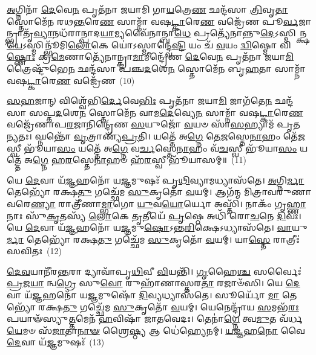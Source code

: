 {\anuvakamend[{\-\ul{𑌜𑌿}\-𑌨𑍍𑌵𑍇𑌤𑍍𑌯𑌵᳴ \ul{𑌪𑍍𑌰}\-𑌜𑌾 𑌜𑌿᳴𑌨𑍍𑌵 \ul{𑌪𑍍𑌰𑌾}\-𑌣\-\ul{𑌨𑍍𑌤𑍍𑌰𑌿}\-\-\ul{𑍞}\-𑌶𑌚𑍍𑌚᳴}]}%

\-\ul{𑌅}\-𑌗𑍍𑌨𑌿𑌨𑌾᳴ \ul{𑌦𑍇}\-𑌵𑍇\-\ul{𑌨} 𑌪𑍃𑌤᳴𑌨𑌾 𑌜𑌯𑌾𑌮𑌿 𑌗𑌾\-\ul{𑌯}\-𑌤𑍍𑌰𑍇\-\ul{𑌣} 𑌛𑌨𑍍𑌦᳴𑌸𑌾 \ul{𑌤𑍍𑌰𑌿}\-𑌵𑍃\-\ul{𑌤𑌾} 𑌸𑍍𑌤𑍋𑌮𑍇᳴𑌨 𑌰𑌥\-\ul{𑌨𑍍𑌤}\-𑌰𑍇\-\ul{𑌣} 𑌸𑌾𑌮𑍍𑌨𑌾᳴ 𑌵𑌷\-\ul{𑌟𑍍𑌕𑌾}\-𑌰𑍇\-\ul{𑌣} 𑌵𑌜𑍍𑌰𑍇᳴𑌣 𑌪𑍂\-\ul{𑌰𑍍𑌵}\-𑌜𑌾𑌨𑍍𑌭𑍍𑌰𑌾𑌤𑍃᳴\-\ul{𑌵𑍍𑌯𑌾}\-𑌨𑌧᳴𑌰𑌾𑌨𑍍𑌪𑌾𑌦\-\ul{𑌯𑌾}\-𑌮𑍍𑌯𑌵𑍈᳴𑌨𑌾𑌨𑍍𑌬𑌾\-\ul{𑌧𑍇} 𑌪𑍍𑌰𑌤𑍍𑌯𑍇᳴𑌨𑌾𑌨𑍍𑌨𑍁\-\ul{𑌦𑍇}\-\-𑌽𑌸𑍍𑌮𑌿𑌨𑍍𑌕𑍍𑌷\-\ul{𑌯𑍇}\-\-𑌽𑌸𑍍𑌮𑌿𑌨𑍍𑌭𑍂᳴𑌮𑌿\-\ul{𑌲𑍋}\-𑌕𑍇 𑌯𑍋॑\-𑌽𑌸𑍍𑌮𑌾𑌨𑍍𑌦𑍍𑌵𑍇\-\ul{𑌷𑍍𑌟𑌿} 𑌯𑌂 𑌚᳴ \ul{𑌵}\-𑌯𑌂 \ul{𑌦𑍍𑌵𑌿}\-𑌷𑍍𑌮𑍋 𑌵𑌿\-\ul{𑌷𑍍𑌣𑍋𑌃} 𑌕𑍍𑌰\-\ul{𑌮𑍇}\-𑌣𑌾𑌤𑍍𑌯𑍇᳴𑌨𑌾𑌨𑍍𑌕𑍍𑌰𑌾\-\ul{𑌮𑌾}\-𑌮𑍀𑌨𑍍𑌦𑍍𑌰𑍇᳴𑌣 \ul{𑌦𑍇}\-𑌵𑍇\-\ul{𑌨} 𑌪𑍃𑌤᳴𑌨𑌾 𑌜𑌯𑌾\-\ul{𑌮𑌿} 𑌤𑍍𑌰𑍈𑌷𑍍𑌟𑍁᳴𑌭𑍇\-\ul{𑌨} 𑌛𑌨𑍍𑌦᳴𑌸𑌾 𑌪𑌞𑍍𑌚\-\ul{𑌦}\-𑌶𑍇\-\ul{𑌨} 𑌸𑍍𑌤𑍋𑌮𑍇᳴𑌨 𑌬𑍃\-\ul{𑌹}\-𑌤𑌾 𑌸𑌾𑌮𑍍𑌨𑌾᳴ 𑌵𑌷\-\ul{𑌟𑍍𑌕𑌾}\-𑌰𑍇\-\ul{𑌣} 𑌵𑌜𑍍𑌰𑍇᳴𑌣~(10)

\-\ul{𑌸}\-\-\ul{𑌹}\-𑌜𑌾𑌨𑍍 𑌵𑌿𑌶𑍍𑌵𑍇᳴𑌭𑌿\-\ul{𑌰𑍍𑌦𑍇}\-𑌵𑍇\-\ul{𑌭𑌿𑌃} 𑌪𑍃𑌤᳴𑌨𑌾 𑌜𑌯𑌾\-\ul{𑌮𑌿} 𑌜𑌾𑌗᳴𑌤𑍇\-\ul{𑌨} 𑌛𑌨𑍍𑌦᳴𑌸𑌾 𑌸𑌪𑍍𑌤\-\ul{𑌦}\-𑌶𑍇\-\ul{𑌨} 𑌸𑍍𑌤𑍋𑌮𑍇᳴𑌨 𑌵𑌾𑌮\-\ul{𑌦𑍇}\-𑌵𑍍𑌯𑍇\-\ul{𑌨} 𑌸𑌾𑌮𑍍𑌨𑌾᳴ 𑌵𑌷\-\ul{𑌟𑍍𑌕𑌾}\-𑌰𑍇\-\ul{𑌣} 𑌵𑌜𑍍𑌰𑍇᳴𑌣𑌾𑌪\-\ul{𑌰}\-𑌜𑌾𑌨𑌿𑌨𑍍𑌦𑍍𑌰𑍇᳴𑌣 \ul{𑌸}\-𑌯𑍁𑌜𑍋᳴ \ul{𑌵}\-𑌯𑍞 𑌸𑌾᳴\-\ul{𑌸}\-𑌹𑍍𑌯𑌾𑌮᳴ 𑌪𑍃𑌤\-\ul{𑌨𑍍𑌯}\-𑌤𑌃। 𑌘𑍍𑌨𑌨𑍍𑌤𑍋᳴ \ul{𑌵𑍃}\-𑌤𑍍𑌰𑌾𑌣𑍍𑌯᳴\-\ul{𑌪𑍍𑌰}\-𑌤𑌿। 𑌯𑌤𑍍𑌤𑍇᳴ 𑌅\-\ul{𑌗𑍍𑌨𑍇} 𑌤𑍇\-\ul{𑌜}\-𑌸𑍍𑌤𑍇\-\ul{𑌨𑌾}\-𑌹𑌂 𑌤𑍇᳴\-\ul{𑌜}\-𑌸𑍍𑌵𑍀 𑌭𑍂᳴𑌯𑌾\-\ul{𑌸𑌂} 𑌯𑌤𑍍𑌤𑍇᳴ 𑌅\-\ul{𑌗𑍍𑌨𑍇} 𑌵\-\ul{𑌰𑍍𑌚}\-𑌸𑍍𑌤𑍇\-\ul{𑌨𑌾}\-𑌹𑌂 𑌵᳴\-\ul{𑌚}\-𑌸𑍍𑌵𑍀 𑌭𑍂᳴𑌯𑌾\-\ul{𑌸𑌂} 𑌯𑌤𑍍𑌤𑍇᳴ 𑌅\-\ul{𑌗𑍍𑌨𑍇} 𑌹\-\ul{𑌰}\-𑌸𑍍𑌤𑍇\-\ul{𑌨𑌾}\-𑌹𑍞 𑌹᳴\-\ul{𑌰}\-𑌸𑍍𑌵𑍀 𑌭𑍂᳴𑌯𑌾𑌸𑌮𑍍॥~(11)

{\anuvakamend[{\-\ul{𑌬𑍃}\-\-\ul{𑌹}\-𑌤𑌾 𑌸𑌾𑌮𑍍𑌨𑌾᳴ 𑌵𑌷\-\ul{𑌟𑍍𑌕𑌾}\-𑌰𑍇\-\ul{𑌣} 𑌵𑌜𑍍𑌰𑍇᳴\-\ul{𑌣} 𑌷𑌟𑍍𑌚᳴𑌤𑍍𑌵𑌾𑌰𑌿𑍞𑌶𑌚𑍍𑌚}]}%

𑌯𑍇 \ul{𑌦𑍇}\-𑌵𑌾 𑌯᳴\-\ul{𑌜𑍍𑌞}\-𑌹𑌨𑍋᳴ 𑌯\-\ul{𑌜𑍍𑌞}\-𑌮𑍁𑌷𑌃᳴ 𑌪𑍃\-\ul{𑌥𑌿}\-𑌵𑍍𑌯𑌾𑌮𑌧𑍍𑌯𑌾𑌸᳴𑌤𑍇। \ul{𑌅}\-𑌗𑍍𑌨𑌿\-\ul{𑌰𑍍𑌮𑌾} 𑌤𑍇𑌭𑍍𑌯𑍋᳴ 𑌰𑌕𑍍𑌷\-\ul{𑌤𑍁} 𑌗𑌚𑍍𑌛𑍇᳴𑌮 \ul{𑌸𑍁}\-𑌕𑍃𑌤𑍋᳴ \ul{𑌵}\-𑌯𑌮𑍍। 𑌆𑌗᳴𑌨𑍍𑌮 𑌮𑌿𑌤𑍍𑌰𑌾𑌵𑌰𑍁𑌣𑌾 𑌵𑌰𑍇\-\ul{𑌣𑍍𑌯𑌾} 𑌰𑌾𑌤𑍍𑌰𑍀᳴𑌣𑌾\-\ul{𑌮𑍍𑌭𑌾}\-𑌗𑍋 \ul{𑌯𑍁}\-𑌵\-\ul{𑌯𑍋}\-𑌰𑍍𑌯𑍋 𑌅𑌸𑍍𑌤𑌿᳴। 𑌨𑌾𑌕𑌂᳴ 𑌗𑍃\-\ul{𑌹𑍍𑌣𑌾}\-𑌨𑌾𑌃 𑌸𑍁᳴\-\ul{𑌕𑍃}\-𑌤𑌸𑍍𑌯᳴ \ul{𑌲𑍋}\-𑌕𑍇 \ul{𑌤𑍃}\-𑌤𑍀𑌯𑍇᳴ \ul{𑌪𑍃}\-𑌷𑍍𑌠𑍇 𑌅𑌧𑌿᳴ 𑌰𑍋\-\ul{𑌚}\-𑌨𑍇 \ul{𑌦𑌿}\-𑌵𑌃। 𑌯𑍇 \ul{𑌦𑍇}\-𑌵𑌾 𑌯᳴\-\ul{𑌜𑍍𑌞}\-𑌹𑌨𑍋᳴ 𑌯\-\ul{𑌜𑍍𑌞}\-𑌮𑍁\-\ul{𑌷𑍋}\-\-𑌽𑌨𑍍𑌤\-\ul{𑌰𑌿}\-𑌕𑍍𑌷𑍇\-𑌽𑌧𑍍𑌯𑌾𑌸᳴𑌤𑍇। \ul{𑌵𑌾}\-𑌯𑍁\-\ul{𑌰𑍍𑌮𑌾} 𑌤𑍇𑌭𑍍𑌯𑍋᳴ 𑌰𑌕𑍍𑌷\-\ul{𑌤𑍁} 𑌗𑌚𑍍𑌛𑍇᳴𑌮 \ul{𑌸𑍁}\-𑌕𑍃𑌤𑍋᳴ \ul{𑌵}\-𑌯𑌮𑍍। 𑌯𑌾\-\ul{𑌸𑍍𑌤𑍇} 𑌰𑌾𑌤𑍍𑌰𑍀𑌃॑ 𑌸𑌵𑌿𑌤𑌃~(12)

\-\ul{𑌦𑍇}\-\-\ul{𑌵}\-𑌯𑌾𑌨𑍀᳴𑌰\-\ul{𑌨𑍍𑌤}\-𑌰𑌾 𑌦𑍍𑌯𑌾𑌵𑌾᳴𑌪𑍃\-\ul{𑌥𑌿}\-𑌵𑍀 \ul{𑌵𑌿}\-𑌯𑌨𑍍𑌤𑌿᳴। \ul{𑌗𑍃}\-𑌹𑍈\-\ul{𑌶𑍍𑌚} 𑌸𑌰𑍍𑌵𑍈𑌃॑ \ul{𑌪𑍍𑌰}\-𑌜\-\ul{𑌯𑌾} 𑌨𑍍𑌵\-\ul{𑌗𑍍𑌰𑍇} 𑌸𑍁\-\ul{𑌵𑍋} 𑌰𑍁𑌹𑌾᳴𑌣𑌾𑌸𑍍𑌤𑌰\-\ul{𑌤𑌾} 𑌰𑌜𑌾𑍞᳴𑌸𑌿। 𑌯𑍇 \ul{𑌦𑍇}\-𑌵𑌾 𑌯᳴\-\ul{𑌜𑍍𑌞}\-𑌹𑌨𑍋᳴ 𑌯\-\ul{𑌜𑍍𑌞}\-𑌮𑍁𑌷𑍋᳴ \ul{𑌦𑌿}\-𑌵𑍍𑌯𑌧𑍍𑌯𑌾𑌸᳴𑌤𑍇। 𑌸𑍂𑌰𑍍𑌯𑍋᳴ \ul{𑌮𑌾} 𑌤𑍇𑌭𑍍𑌯𑍋᳴ 𑌰𑌕𑍍𑌷\-\ul{𑌤𑍁} 𑌗𑌚𑍍𑌛𑍇᳴𑌮 \ul{𑌸𑍁}\-𑌕𑍃𑌤𑍋᳴ \ul{𑌵}\-𑌯𑌮𑍍। 𑌯𑍇𑌨𑍇𑌨𑍍𑌦𑍍𑌰𑌾᳴𑌯 \ul{𑌸}\-𑌮𑌭᳴\-\ul{𑌰𑌃} 𑌪𑌯𑌾𑍟᳴𑌸𑍍𑌯𑍁\-\ul{𑌤𑍍𑌤}\-\-𑌮𑍇𑌨᳴ \ul{𑌹}\-𑌵𑌿𑌷𑌾᳴ 𑌜𑌾𑌤𑌵𑍇𑌦𑌃। 𑌤𑍇𑌨𑌾॑\-\ul{𑌗𑍍𑌨𑍇} 𑌤𑍍𑌵\-\ul{𑌮𑍁}\-𑌤 𑌵᳴𑌰𑍍𑌧\-\ul{𑌯𑍇}\-𑌮𑍞 𑌸᳴\-\ul{𑌜𑌾}\-𑌤𑌾\-\ul{𑌨𑌾}\-\-\ul{𑍟} 𑌶𑍍𑌰𑍈\-\ul{𑌷𑍍𑌠𑍍𑌯} 𑌆 𑌧𑍇॑𑌹𑍍𑌯𑍇𑌨𑌮𑍍। \ul{𑌯}\-\-\ul{𑌜𑍍𑌞}\-𑌹\-\ul{𑌨𑍋} 𑌵𑍈 \ul{𑌦𑍇}\-𑌵𑌾 𑌯᳴\-\ul{𑌜𑍍𑌞}\-𑌮𑍁𑌷𑌃᳴~(13)

